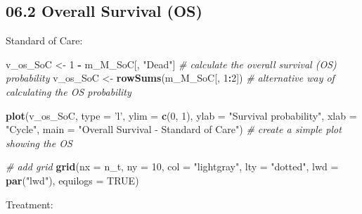 \documentclass[]{article}
\newenvironment{Shaded}{\begin{snugshade}}{\end{snugshade}}
\newcommand{\KeywordTok}[1]{\textcolor[rgb]{0.13,0.29,0.53}{\textbf{#1}}}
\newcommand{\DataTypeTok}[1]{\textcolor[rgb]{0.13,0.29,0.53}{#1}}
\newcommand{\DecValTok}[1]{\textcolor[rgb]{0.00,0.00,0.81}{#1}}
\newcommand{\StringTok}[1]{\textcolor[rgb]{0.31,0.60,0.02}{#1}}
\newcommand{\CommentTok}[1]{\textcolor[rgb]{0.56,0.35,0.01}{\textit{#1}}}
\newcommand{\OtherTok}[1]{\textcolor[rgb]{0.56,0.35,0.01}{#1}}
\newcommand{\OperatorTok}[1]{\textcolor[rgb]{0.81,0.36,0.00}{\textbf{#1}}}
\newcommand{\NormalTok}[1]{#1}
\begin{document}
\subsection{06.2 Overall Survival (OS)}\label{overall-survival-os}

Standard of Care:

\begin{Shaded}
\begin{Highlighting}[]
\NormalTok{v_os_SoC <-}\StringTok{ }\DecValTok{1} \OperatorTok{-}\StringTok{ }\NormalTok{m_M_SoC[, }\StringTok{"Dead"}\NormalTok{]    }\CommentTok{# calculate the overall survival (OS) probability}
\NormalTok{v_os_SoC <-}\StringTok{ }\KeywordTok{rowSums}\NormalTok{(m_M_SoC[, }\DecValTok{1}\OperatorTok{:}\DecValTok{2}\NormalTok{])  }\CommentTok{# alternative way of calculating the OS probability   }

\KeywordTok{plot}\NormalTok{(v_os_SoC, }\DataTypeTok{type =} \StringTok{'l'}\NormalTok{, }
     \DataTypeTok{ylim =} \KeywordTok{c}\NormalTok{(}\DecValTok{0}\NormalTok{, }\DecValTok{1}\NormalTok{),}
     \DataTypeTok{ylab =} \StringTok{"Survival probability"}\NormalTok{,}
     \DataTypeTok{xlab =} \StringTok{"Cycle"}\NormalTok{,}
     \DataTypeTok{main =} \StringTok{"Overall Survival - Standard of Care"}\NormalTok{)  }\CommentTok{# create a simple plot showing the OS}

\CommentTok{# add grid }
\KeywordTok{grid}\NormalTok{(}\DataTypeTok{nx =}\NormalTok{ n_t, }\DataTypeTok{ny =} \DecValTok{10}\NormalTok{, }\DataTypeTok{col =} \StringTok{"lightgray"}\NormalTok{, }\DataTypeTok{lty =} \StringTok{"dotted"}\NormalTok{, }\DataTypeTok{lwd =} \KeywordTok{par}\NormalTok{(}\StringTok{"lwd"}\NormalTok{), }
     \DataTypeTok{equilogs =} \OtherTok{TRUE}\NormalTok{) }
\end{Highlighting}
\end{Shaded}

Treatment:
\end{document}
